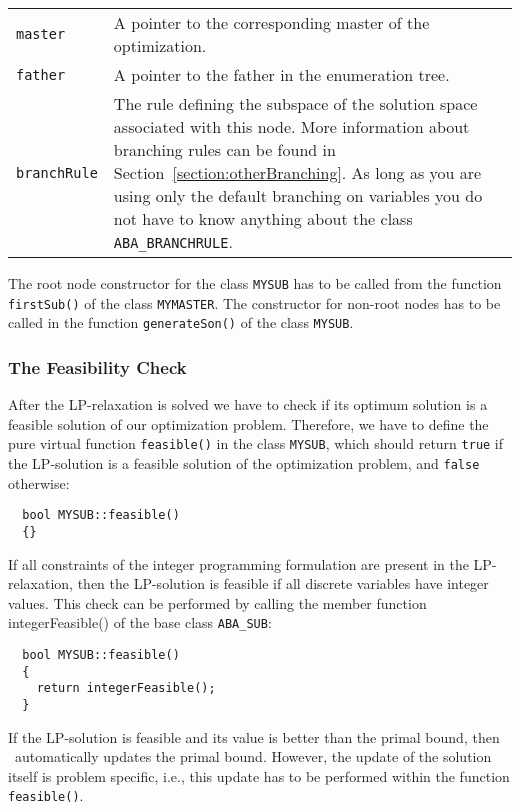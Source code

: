 \begin{center}
\begin{tabular}{lp{}}
  {\tt master}     &A pointer to the corresponding master of the
                    optimization.\\
  {\tt father}     &A pointer to the father in the enumeration tree.\\
  {\tt branchRule} &The rule defining the subspace of the
                    solution space associated with this node. More
                    information about branching rules can be found
                    in Section~\ref{section:otherBranching}. As long
                    as you are using only the default branching on
                    variables you do not have to know anything about
                    the class {\tt ABA\_BRANCHRULE}.\\
\end{tabular}
\end{center}

The root node constructor for the class {\tt MYSUB} has to be called
from the function {\tt firstSub()} of the class {\tt MYMASTER}. The 
constructor for non-root nodes has to be called in the function
{\tt generateSon()} of the class {\tt MYSUB}.

\subsubsection{The Feasibility Check}

After the  LP-relaxation is solved we have to check if its optimum solution
is a feasible solution of our optimization problem. Therefore, we
have to define the pure virtual function {\tt feasible()} in the class
{\tt MYSUB}, which should return {\tt true} if the LP-solution is
a feasible solution of the optimization problem, and {\tt false} otherwise:
\begin{verbatim}
  bool MYSUB::feasible()
  {}
\end{verbatim}
\noindent
If all constraints of the integer programming formulation are present in
the LP-relaxation, then the LP-solution is feasible if all discrete variables
have integer values. This check can be performed by calling the member function
{integerFeasible()} of the base class {\tt ABA\_SUB}:
\begin{verbatim}
  bool MYSUB::feasible()
  {
    return integerFeasible();
  }
\end{verbatim}
If the LP-solution is feasible and its value is better than the primal
bound, then \ABACUS\ automatically updates the primal bound. However,
the update of the solution itself is problem specific, i.e., this update
has to be performed within the function {\tt feasible()}.

